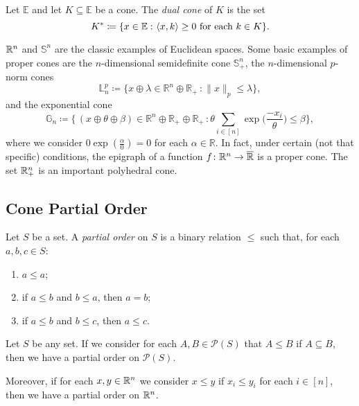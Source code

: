 \documentclass[a4paper]{article}
\begin{document}
\begin{definition}
Let \(\mathbb{E}\) and let \(K\subseteq \mathbb{E}\) be a cone. The \emph{dual cone} of \(K\) is the set \[K^\ast\coloneqq\{x\in\mathbb{E}\,\colon \langle x,k \rangle\geq 0 \text{ for each } k\in K\}.\] 
\end{definition}


\begin{example}
\(\mathbb{R}^n\) and \(\mathbb{S}^n\) are the classic examples of Euclidean spaces.
Some basic examples of proper cones are the \(n\)-dimensional 
semidefinite cone \(\mathbb{S}^n_+\), the \(n\)-dimensional 
\(p\)-norm cones 
\[\mathbb{L}_n^p\coloneqq\{x\oplus\lambda\in\mathbb{R}^n\oplus\mathbb{R}_+\,\colon \|x\|_p\leq \lambda\},\] 
and the exponential cone
$$\mathbb{G}_n \coloneqq\Bigg\{\,(x\oplus\theta\oplus\beta) \in\mathbb{R}^n\oplus\mathbb{R}_+\oplus\mathbb{R}_+\,\colon \theta\sum_{i\in [n]}\exp\bigg(\frac{-x_i}{\theta}\bigg)\leq\beta \Bigg\},$$
where we consider $0\exp(\frac{\alpha}{0})=0$ for each $\alpha\in\mathbb{R}$.
In fact, under certain (not that specific) conditions, the epigraph of a function 
\(f\colon\mathbb{R}^n\to\overline{\mathbb{R}}\) is a proper cone. The set 
\(\mathbb{R}^n_+\) is an important polyhedral cone. 
\end{example}
\subsection*{Cone Partial Order}

\begin{definition}
Let \(S\) be a set. A \emph{partial order} on $S$ is a binary relation $\leq$ such that, for each $a,b,c\in S$:
\begin{enumerate}[label=(\roman*)]
\item $a\leq a$;
\item if $a\leq b$ and $b\leq a$, then $a=b$; 
\item if $a\leq b$ and $b\leq c$, then $a\leq c$.
\end{enumerate}
\end{definition}

\begin{example}
  Let \(S\) be any set. If we consider for each \(A,B\in\mathcal{P}(S)\) that
  \(A\leq B\) if \(A\subseteq B\), then we have a partial order on
  \(\mathcal{P}(S)\).

  Moreover, if for each \(x,y\in\mathbb{R}^n\)  we consider \(x\leq y\) if
  \(x_i\leq y_i\) for each \(i\in [n]\), then we have a partial order on \(\mathbb{R}^n\).
\end{example}
\end{document}
